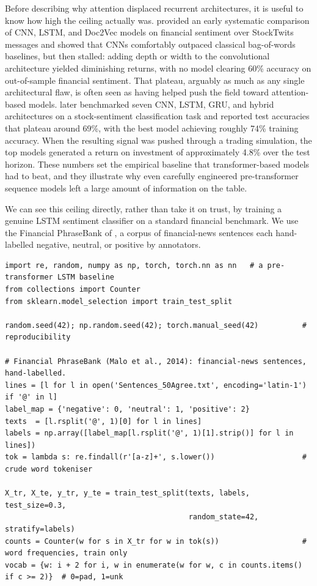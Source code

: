 Before describing why attention displaced recurrent architectures, it is useful to know how high the ceiling actually was. \cite{sohangir2018big} provided an early systematic comparison of CNN, LSTM, and Doc2Vec models on financial sentiment over StockTwits messages and showed that CNNs comfortably outpaced classical bag-of-words baselines, but then stalled: adding depth or width to the convolutional architecture yielded diminishing returns, with no model clearing 60\% accuracy on out-of-sample financial sentiment. That plateau, arguably as much as any single architectural flaw, is often seen as having helped push the field toward attention-based models. \cite{correia2022dnn} later benchmarked seven CNN, LSTM, GRU, and hybrid architectures on a stock-sentiment classification task and reported test accuracies that plateau around 69\%, with the best model achieving roughly 74\% training accuracy. When the resulting signal was pushed through a trading simulation, the top models generated a return on investment of approximately 4.8\% over the test horizon. These numbers set the empirical baseline that transformer-based models had to beat, and they illustrate why even carefully engineered pre-transformer sequence models left a large amount of information on the table.

We can see this ceiling directly, rather than take it on trust, by training a genuine LSTM sentiment classifier on a standard financial benchmark. We use the Financial PhraseBank of \cite{malo2014good}, a corpus of financial-news sentences each hand-labelled negative, neutral, or positive by annotators.

\begin{verbatim}
import re, random, numpy as np, torch, torch.nn as nn   # a pre-transformer LSTM baseline
from collections import Counter
from sklearn.model_selection import train_test_split

random.seed(42); np.random.seed(42); torch.manual_seed(42)          # reproducibility

# Financial PhraseBank (Malo et al., 2014): financial-news sentences, hand-labelled.
lines = [l for l in open('Sentences_50Agree.txt', encoding='latin-1') if '@' in l]
label_map = {'negative': 0, 'neutral': 1, 'positive': 2}
texts  = [l.rsplit('@', 1)[0] for l in lines]
labels = np.array([label_map[l.rsplit('@', 1)[1].strip()] for l in lines])
tok = lambda s: re.findall(r'[a-z]+', s.lower())                    # crude word tokeniser

X_tr, X_te, y_tr, y_te = train_test_split(texts, labels, test_size=0.3,
                                          random_state=42, stratify=labels)
counts = Counter(w for s in X_tr for w in tok(s))                   # word frequencies, train only
vocab = {w: i + 2 for i, w in enumerate(w for w, c in counts.items() if c >= 2)}  # 0=pad, 1=unk
\end{verbatim}

